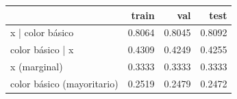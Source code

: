 \begin{tabular}{lrrr}
\toprule
 & train & val & test \\
\midrule
x | color básico & 0.8064 & 0.8045 & 0.8092 \\
color básico | x & 0.4309 & 0.4249 & 0.4255 \\
x (marginal) & 0.3333 & 0.3333 & 0.3333 \\
color básico (mayoritario) & 0.2519 & 0.2479 & 0.2472 \\
\bottomrule
\end{tabular}
